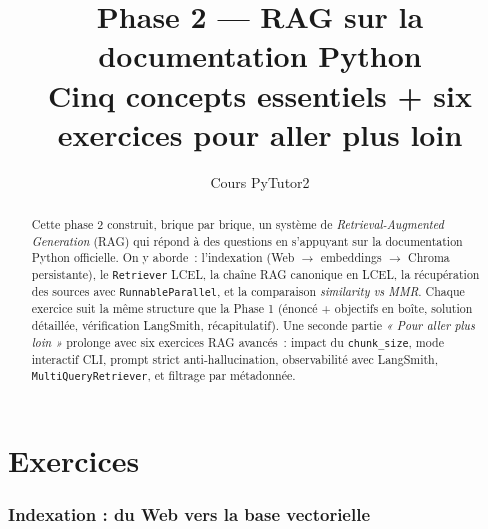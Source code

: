 \documentclass[11pt,a4paper]{article}
\title{\textbf{Phase 2 — RAG sur la documentation Python}\\
\large Cinq concepts essentiels + six exercices pour aller plus loin}
\author{Cours PyTutor2}
\date{}
\begin{document}
\maketitle

\begin{abstract}
\noindent
Cette phase 2 construit, brique par brique, un système de
\emph{Retrieval-Augmented Generation} (RAG) qui répond à des questions
en s'appuyant sur la documentation Python officielle. On y aborde~:
l'indexation (Web $\to$ embeddings $\to$ Chroma persistante), le
\texttt{Retriever} LCEL, la chaîne RAG canonique en LCEL, la récupération
des sources avec \texttt{RunnableParallel}, et la comparaison
\emph{similarity vs MMR}. Chaque exercice suit la même structure que
la Phase 1 (énoncé + objectifs en boîte, solution détaillée, vérification
LangSmith, récapitulatif). Une seconde partie
\emph{« Pour aller plus loin »} prolonge avec six exercices RAG avancés~:
impact du \texttt{chunk\_size}, mode interactif CLI, prompt strict
anti-hallucination, observabilité avec LangSmith,
\texttt{MultiQueryRetriever}, et filtrage par métadonnée.
\end{abstract}

\tableofcontents
\bigskip

\part{Exercices}

\section{Indexation : du Web vers la base vectorielle}
\end{document}
